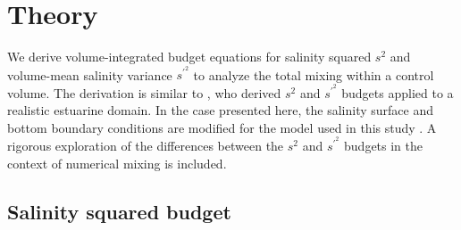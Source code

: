 \documentclass[draft]{agujournal2019}
\begin{document}
\section{Theory} \label{sec:theory}

We derive volume-integrated budget equations for salinity squared $s^2$ and volume-mean salinity variance $s^{\prime^2}$ to analyze the total mixing within a control volume. The derivation is similar to , who derived $s^2$ and $s^{\prime^2}$ budgets applied to a realistic estuarine domain. In the case presented here, the salinity surface and bottom boundary conditions are modified for the model used in this study \cite<Regional Ocean Modeling Systems, ROMS,>[]{shchepetkin2005regional}. A rigorous exploration of the differences between the $s^2$ and $s^{\prime^2}$ budgets in the context of numerical mixing is included. 

\subsection{Salinity squared budget}
\end{document}
